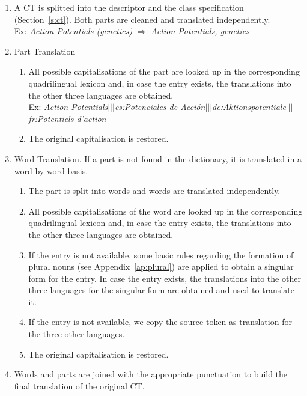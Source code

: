 \documentclass[a4paper,11pt]{article}
\begin{document}
\begin{enumerate}
 \item A CT is splitted into the descriptor and the class specification (Section~\ref{s:ct}). Both parts are cleaned and translated independently. \\ 
       Ex: \emph{Action Potentials (genetics)} $\Rightarrow$ \emph{Action Potentials, genetics}
 \item Part Translation
      \begin{enumerate}[label*=\arabic*.]
      \item  All possible capitalisations of the part are looked up in the corresponding quadrilingual lexicon and, in case the entry exists, the translations into the other three languages are obtained.\\ 
       Ex: \emph{Action Potentials$|||$es:Potenciales de Acción$|||$de:Aktionspotentiale$|||$fr:Potentiels d'action}
      \item The original capitalisation is restored.
      \end{enumerate}

 \item Word Translation. If a part is not found in the dictionary, it is translated in a word-by-word basis.
      \begin{enumerate}[label*=\arabic*.]
	\item The part is split into words and words are translated independently.  
	\item  All possible capitalisations of the word are looked up in the corresponding quadrilingual lexicon and, in case the entry exists, the translations into the other three languages are obtained.
	\item If the entry is not available, some basic rules regarding the formation of plural nouns (see Appendix~\ref{ap:plural}) are applied to obtain a singular form for the entry. In case the entry exists, the translations into the other three languages for the singular form are obtained and used to translate it.
	\item If the entry is not available, we copy the source token as translation for the three other languages.
	\item The original capitalisation is restored.
      \end{enumerate}
     
  \item Words and parts are joined with the appropriate punctuation to build the final translation of the original CT.
     
\end{enumerate}
\end{document}
